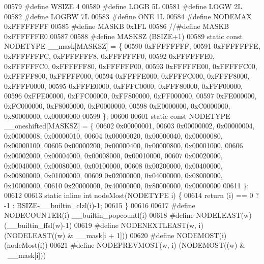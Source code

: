 \begin{DoxyCode}
00579 \textcolor{preprocessor}{#define WSIZE 4                                         }
00580 \textcolor{preprocessor}{#define LOGB 5L                                         }
00581 \textcolor{preprocessor}{#define LOGW 2L                                         }
00582 \textcolor{preprocessor}{#define LOGBW 7L                                        }
00583 \textcolor{preprocessor}{#define ONE 1L                                          }
00584 \textcolor{preprocessor}{#define NODEMAX 0xFFFFFFFF                      }
00585 \textcolor{preprocessor}{#define MASKB 0x1FL                                     }
00586 \textcolor{preprocessor}{//#define MASKB 0xFFFFFFE0}
00587 
00588 \textcolor{preprocessor}{#define MASKSZ (BSIZE+1)                        }
00589 \textcolor{preprocessor}{static const NODETYPE \_\_mask[MASKSZ] = \{}
00590         0xFFFFFFFF,
00591         0xFFFFFFFE, 0xFFFFFFFC, 0xFFFFFFF8, 0xFFFFFFF0,
00592         0xFFFFFFE0, 0xFFFFFFC0, 0xFFFFFF80, 0xFFFFFF00,
00593         0xFFFFFE00, 0xFFFFFC00, 0xFFFFF800, 0xFFFFF000,
00594         0xFFFFE000, 0xFFFFC000, 0xFFFF8000, 0xFFFF0000,
00595         0xFFFE0000, 0xFFFC0000, 0xFFF80000, 0xFFF00000,
00596         0xFFE00000, 0xFFC00000, 0xFF800000, 0xFF000000,
00597         0xFE000000, 0xFC000000, 0xF8000000, 0xF0000000,
00598         0xE0000000, 0xC0000000, 0x80000000, 0x00000000
00599 \};
00600 
00601 \textcolor{keyword}{static} \textcolor{keyword}{const} NODETYPE \_\_oneshifted[MASKSZ] = \{
00602         0x00000001,
00603         0x00000002, 0x00000004, 0x00000008, 0x00000010,
00604         0x00000020, 0x00000040, 0x00000080, 0x00000100,
00605         0x00000200, 0x00000400, 0x00000800, 0x00001000,
00606         0x00002000, 0x00004000, 0x00008000, 0x00010000,
00607         0x00020000, 0x00040000, 0x00080000, 0x00100000,
00608         0x00200000, 0x00400000, 0x00800000, 0x01000000,
00609         0x02000000, 0x04000000, 0x08000000, 0x10000000,
00610         0x20000000, 0x40000000, 0x80000000, 0x00000000
00611 \};
00612 
00613 \textcolor{keyword}{static} \textcolor{keyword}{inline} \textcolor{keywordtype}{int} nodeMost(NODETYPE i) \{
00614         \textcolor{keywordflow}{return} (i) == 0 ? -1 : BSIZE-\_\_builtin\_clzl(i)-1;
00615 \}
00616 
00617 \textcolor{preprocessor}{#define NODECOUNTER(i) \_\_builtin\_popcountl(i)}
00618 \textcolor{preprocessor}{#define NODELEAST(w) (\_\_builtin\_ffsl(w)-1)}
00619 \textcolor{preprocessor}{#define NODENEXTLEAST(w, i) (NODELEAST((w) & \_\_mask[i + 1]))}
00620 \textcolor{preprocessor}{#define NODEMOST(i) (nodeMost(i))}
00621 \textcolor{preprocessor}{#define NODEPREVMOST(w, i) (NODEMOST((w) & ~\_\_mask[i]))}

\end{DoxyCode}
